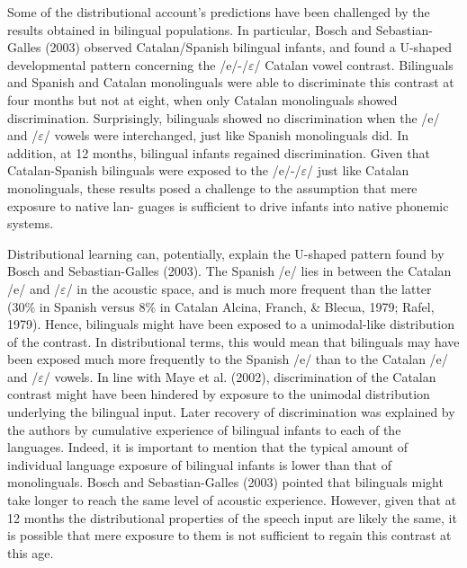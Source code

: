\documentclass[man,floatsintext]{apa6}
\begin{document}
Some of the distributional account's predictions have been challenged by the results obtained in bilingual populations. In particular, Bosch and Sebastian-Galles (2003) observed Catalan/Spanish bilingual infants, and found a U-shaped developmental pattern concerning the /e/-/\(\varepsilon\)/ Catalan vowel contrast. Bilinguals and Spanish and Catalan monolinguals were able to discriminate this contrast at four months but not at eight, when only Catalan monolinguals showed discrimination. Surprisingly, bilinguals showed no discrimination when the /e/ and /\(\varepsilon\)/ vowels were interchanged, just like Spanish monolinguals did. In addition, at 12 months, bilingual infants regained discrimination. Given that Catalan-Spanish bilinguals were exposed to the /e/-/\(\varepsilon\)/ just like Catalan monolinguals, these results posed a challenge to the assumption that mere exposure to native lan- guages is sufficient to drive infants into native phonemic systems.

Distributional learning can, potentially, explain the U-shaped pattern found by Bosch and Sebastian-Galles (2003). The Spanish /e/ lies in between the Catalan /e/ and /\(\varepsilon\)/ in the acoustic space, and is much more frequent than the latter (30\% in Spanish versus 8\% in Catalan Alcina, Franch, \& Blecua, 1979; Rafel, 1979). Hence, bilinguals might have been exposed to a unimodal-like distribution of the contrast. In distributional terms, this would mean that bilinguals may have been exposed much more frequently to the Spanish /e/ than to the Catalan /e/ and /\(\varepsilon\)/ vowels. In line with Maye et al. (2002), discrimination of the Catalan contrast might have been hindered by exposure to the unimodal distribution underlying the bilingual input. Later recovery of discrimination was explained by the authors by cumulative experience of bilingual infants to each of the languages. Indeed, it is important to mention that the typical amount of individual language exposure of bilingual infants is lower than that of monolinguals. Bosch and Sebastian-Galles (2003) pointed that bilinguals might take longer to reach the same level of acoustic experience. However, given that at 12 months the distributional properties of the speech input are likely the same, it is possible that mere exposure to them is not sufficient to regain this contrast at this age.
\end{document}

